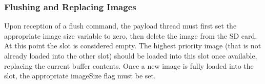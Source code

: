 \documentclass{article}
\begin{document}
\subsubsection{Flushing and Replacing Images}
Upon reception of a flush command, the payload thread must first set the
appropriate image size variable to zero, then delete the image
from the SD card. At this point the slot is
considered empty. The highest priority image (that is not already loaded into
the other slot) should be loaded into this slot
once available, replacing the current buffer contents. Once a new image is fully
loaded into the slot, the appropriate imageSize flag must be set.
\end{document}
